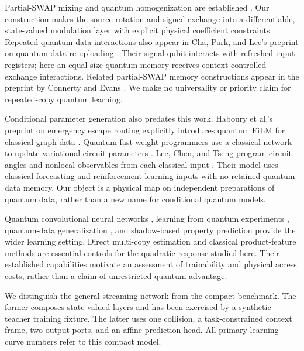 \documentclass[pdflatex,sn-mathphys-num]{sn-jnl}
\begin{document}
Partial-SWAP mixing and quantum homogenization are established \cite{ziman,audenaert}. Our construction makes the source rotation and signed exchange into a differentiable, state-valued modulation layer with explicit physical coefficient constraints. Repeated quantum-data interactions also appear in Cha, Park, and Lee's preprint on quantum-data re-uploading \cite{cha_reupload}. Their signal qubit interacts with refreshed input registers; here an equal-size quantum memory receives context-controlled exchange interactions. Related partial-SWAP memory constructions appear in the preprint by Connerty and Evans \cite{connerty_memory}. We make no universality or priority claim for repeated-copy quantum learning.

Conditional parameter generation also predates this work. Haboury et al.'s preprint on emergency escape routing explicitly introduces quantum FiLM for classical graph data \cite{haboury_routing}. Quantum fast-weight programmers use a classical network to update variational-circuit parameters \cite{fastweights}. Lee, Chen, and Tseng program circuit angles and nonlocal observables from each classical input \cite{lee_observables}. Their model uses classical forecasting and reinforcement-learning inputs with no retained quantum-data memory. Our object is a physical map on independent preparations of quantum data, rather than a new name for conditional quantum models.

Quantum convolutional neural networks \cite{qcnn}, learning from quantum experiments \cite{experiments}, quantum-data generalization \cite{generalization}, and shadow-based property prediction \cite{shadows} provide the wider learning setting. Direct multi-copy estimation \cite{ekert} and classical product-feature methods are essential controls for the quadratic response studied here. Their established capabilities motivate an assessment of trainability and physical access costs, rather than a claim of unrestricted quantum advantage.

We distinguish the general streaming network from the compact benchmark. The former composes state-valued layers and has been exercised by a synthetic teacher training fixture. The latter uses one collision, a task-constrained context frame, two output ports, and an affine prediction head. All primary learning-curve numbers refer to this compact model.
\end{document}
